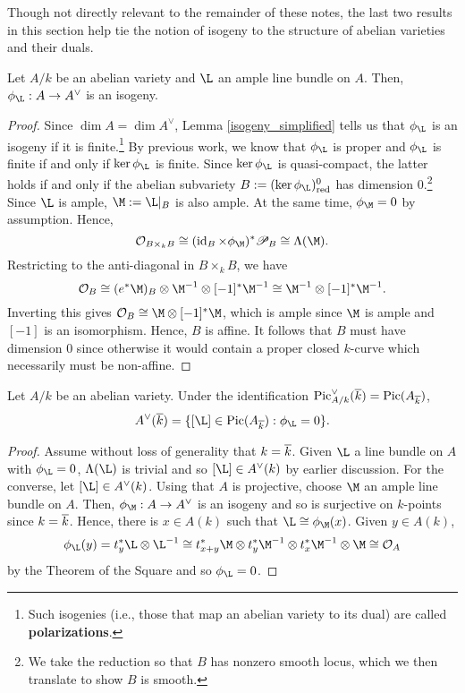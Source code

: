 \documentclass[11pt]{article}
\begin{document}
Though not directly relevant to the remainder of these notes, the last two results in this section help tie the notion of isogeny to the structure of abelian varieties and their duals.

\begin{proposition}\label{phi_is_isogeny}
Let $A/k$ be an abelian variety and $\L$ an ample line bundle on $A$. Then, $\phi_{\L}: A\to A^{\vee}$ is an isogeny.
\end{proposition}

\begin{proof}
Since $\dim A=\dim A^{\vee}$, Lemma \ref{isogeny_simplified} tells us that $\phi_{\L}$ is an isogeny if it is finite.\footnote{Such isogenies (i.e., those that map an abelian variety to its dual) are called \textbf{polarizations}.} By previous work, we know that $\phi_{\L}$ is proper and $\phi_{\L}$ is finite if and only if $\ker\phi_{\L}$ is finite. Since $\ker\phi_{\L}$ is quasi-compact, the latter holds if and only if the abelian subvariety $B:=(\ker\phi_{\L})_{\red}^0$ has dimension $0$.\footnote{We take the reduction so that $B$ has nonzero smooth locus, which we then translate to show $B$ is smooth.} Since $\L$ is ample, $\M:=\L|_B$ is also ample. At the same time, $\phi_{\M}=0$ by assumption. Hence, 
$$\O_{B\times_kB}\iso(\id_B\times\phi_{\M})^*\ms{P}_B\iso\Lambda(\M).$$
Restricting to the anti-diagonal in $B\times_kB$, we have
$$\O_B\iso(e^*\M)_B\tensor\M^{-1}\tensor[-1]^*\M^{-1}\iso\M^{-1}\tensor[-1]^*\M^{-1}.$$
Inverting this gives $\O_B\iso\M\tensor[-1]^*\M$, which is ample since $\M$ is ample and $[-1]$ is an isomorphism. Hence, $B$ is affine. It follows that $B$ must have dimension $0$ since otherwise it would contain a proper closed $k$-curve which necessarily must be non-affine.
\end{proof}

\begin{corollary}
Let $A/k$ be an abelian variety. Under the identification $\operatorname{Pic}_{A/k}^{\vee}(\overline{k})=\operatorname{Pic}(A_{\overline{k}})$,
$$A^{\vee}(\ov{k})=\{[\L]\in\Pic(A_{\ov{k}}) : \phi_{\L}=0\}.$$
\end{corollary}

\begin{proof}
Assume without loss of generality that $k=\overline{k}$. Given $\L$ a line bundle on $A$ with $\phi_{\L}=0$, $\Lambda(\L)$ is trivial and so $[\L]\in A^{\vee}(k)$ by earlier discussion. For the converse, let $[\L]\in A^{\vee}(k)$. Using that $A$ is projective, choose $\M$ an ample line bundle on $A$. Then, $\phi_{\M}: A\to A^{\vee}$ is an isogeny and so is surjective on $k$-points since $k=\overline{k}$. Hence, there is $x\in A(k)$ such that $\L\iso\phi_{\M}(x)$. Given $y\in A(k)$,
$$\phi_{\L}(y)=t_y^*\L\tensor\L^{-1}\iso t_{x+y}^*\M\tensor t_y^*\M^{-1}\tensor t_x^*\M^{-1}\tensor\M\iso\O_A$$
by the Theorem of the Square and so $\phi_{\L}=0$.
\end{proof}
\end{document}
